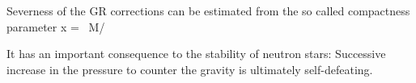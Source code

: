 Severness of the GR corrections can be estimated from the so called compactness parameter
\be
x =  ~M/\Msun \km
\ee


It has an important consequence to the stability of neutron stars:
Successive increase in the pressure to counter the gravity is ultimately self-defeating.










